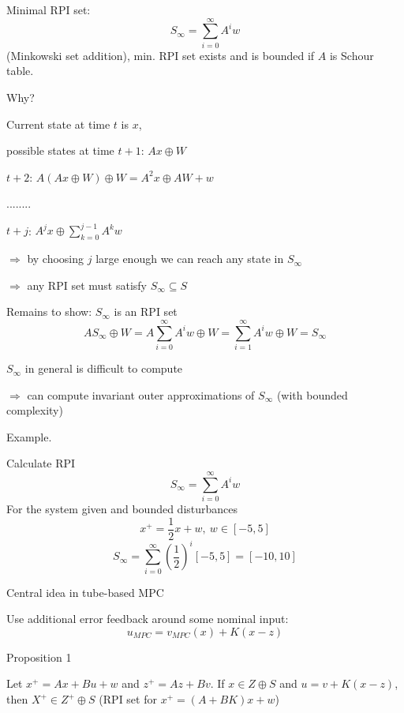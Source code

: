 Minimal RPI set:
\begin{equation*}
S_{\infty} = \sum_{i = 0}^{\infty} A^iw
\end{equation*}
(Minkowski set addition), min. RPI set exists and is bounded if $A$ is Schour table.

Why?

Current state at time $t$ is $x$,

possible states at time $t+1$: $Ax \oplus W$
                        
$t+2$: $A(Ax \oplus W) \oplus W = A^2x \oplus AW + w$
  
       ........
        
$t+j$: $A^jx \oplus \sum_{k=0}^{j-1}A^kw$

$\Rightarrow$ by choosing $j$ large enough we can reach any state in $S_{\infty}$

$\Rightarrow$ any RPI set must satisfy $S_{\infty} \subseteq S$

Remains to show: $S_{\infty}$ is an RPI set
\begin{equation*}
AS_{\infty} \oplus W = A\sum_{i=0}^{\infty}A^iw \oplus W = \sum_{i=1}^{\infty}A^iw \oplus W = S_{\infty} 
\end{equation*}

$S_{\infty}$ in  general is difficult to compute 

$\Rightarrow$ can compute invariant outer approximations of $S_{\infty}$ (with bounded complexity)

Example. 

Calculate RPI 
\begin{equation*}
S_{\infty} = \sum_{i=0}^{\infty} A^iw
\end{equation*}
For the system given and bounded disturbances
\begin{equation*}
x^+=\frac{1}{2}x + w, \ w \in [-5,5]
\end{equation*}
\begin{equation*}
S_{\infty} = \sum_{i=0}^{\infty}(\frac{1}{2})^i [-5,5] = [-10, 10]
\end{equation*}

Central idea in tube-based MPC

Use additional error feedback around some nominal input:
\begin{equation*}
u_{MPC} = v_{MPC}(x) + K (x - z)
\end{equation*}

Proposition 1

Let $x^+ = Ax + Bu + w$ and $z^+ = Az + Bv$. If $ x \in Z \oplus S$ and $ u = v + K(x - z)$, then $ X^+ \in Z^+ \oplus S$ (RPI set for $x^+ = (A+BK)x + w$)

